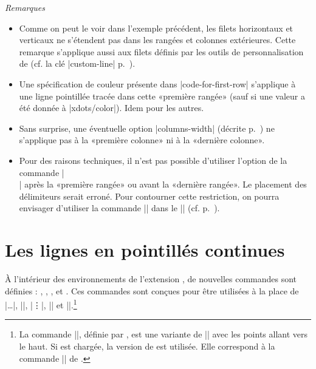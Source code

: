 \documentclass[dvipsnames]{article}%
\begin{document}
\emph{Remarques}
\begin{itemize}[beginpenalty=10000]
\item Comme on peut le voir dans l'exemple précédent, les filets horizontaux et
verticaux ne s'étendent pas dans les rangées et colonnes extérieures. Cette
remarque s'applique aussi aux filets définis par les outils de personnalisation
de  (cf. la clé |custom-line| p.~\pageref{custom-line}).

\item Une spécification de couleur présente dans |code-for-first-row| s'applique
à une ligne pointillée tracée dans cette «première rangée» (sauf si une valeur a
été donnée à |xdots/color|). Idem pour les autres.
\item Sans surprise, une éventuelle option |columns-width| (décrite
p.~\pageref{width}) ne s'applique pas à la «première colonne» ni à la «dernière
colonne».
\item Pour des raisons techniques, il n'est pas possible d'utiliser l'option de
la commande |\\| après la «première rangée» ou avant la «dernière rangée». Le
placement des délimiteurs serait erroné. Pour contourner cette restriction, on
pourra envisager d'utiliser la commande |\SubMatrix| dans le |\CodeAfter| (cf.
p.~\pageref{sub-matrix}).
\end{itemize}





\section{Les lignes en pointillés continues}

\label{Cdots}

À l'intérieur des environnements de l'extension , de nouvelles
commandes sont définies : ,
, ,
 et . 
Ces commandes sont conçues pour être utilisées à la place de |\dots|, |\cdots|,
|\vdots|, |\ddots| et |\iddots|.\footnote{La commande |\iddots|, définie par
  , est une variante de |\ddots| avec les points allant vers le
  haut. Si  est chargée, la version de  est
  utilisée. Elle correspond à la commande |\adots| de .}
 \setcounter{fniddots}{\thefootnote}
\end{document}
